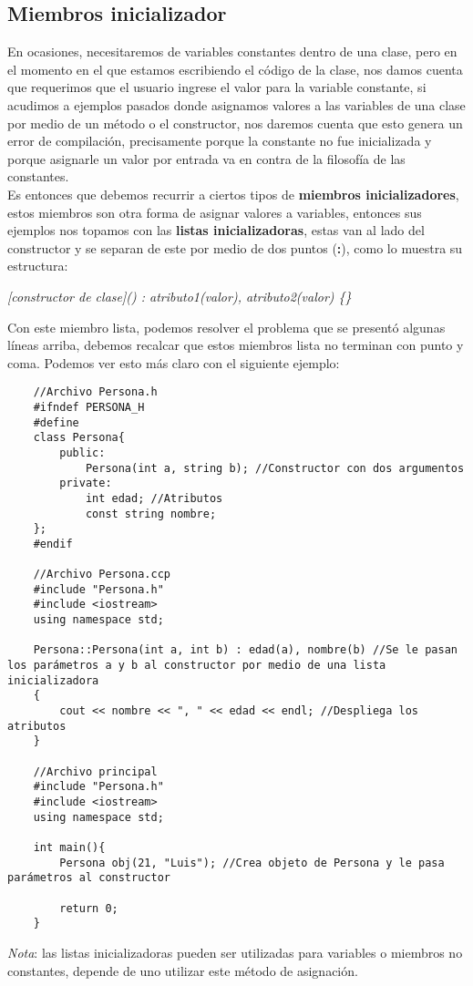 \subsection{Miembros inicializador}
En ocasiones, necesitaremos de variables constantes dentro de una clase, pero en el momento en el que estamos escribiendo el código de la clase, nos damos cuenta que requerimos que el usuario ingrese el valor para la variable constante, si acudimos a ejemplos pasados donde asignamos valores a las variables de una clase por medio de un método o el constructor, nos daremos cuenta que esto genera un error de compilación, precisamente porque la constante no fue inicializada y porque asignarle un valor por entrada va en contra de la filosofía de las constantes.\\
Es entonces que debemos recurrir a ciertos tipos de \textbf{miembros inicializadores}, estos miembros son otra forma de asignar valores a variables, entonces sus ejemplos nos topamos con las \textbf{listas inicializadoras}, estas van al lado del constructor y se separan de este por medio de dos puntos (\textbf{:}), como lo muestra su estructura:\begin{center}\textit{[constructor de clase]() : atributo1(valor), atributo2(valor) \{\}}\end{center}
Con este miembro lista, podemos resolver el problema que se presentó algunas líneas arriba, debemos recalcar que estos miembros lista no terminan con punto y coma. Podemos ver esto más claro con el siguiente ejemplo:
\begin{lstlisting}
    //Archivo Persona.h
    #ifndef PERSONA_H
    #define
    class Persona{
        public:
            Persona(int a, string b); //Constructor con dos argumentos
        private:
            int edad; //Atributos
            const string nombre;
    };
    #endif
    
    //Archivo Persona.ccp
    #include "Persona.h"
    #include <iostream>
    using namespace std;
    
    Persona::Persona(int a, int b) : edad(a), nombre(b) //Se le pasan los parámetros a y b al constructor por medio de una lista inicializadora
    {
        cout << nombre << ", " << edad << endl; //Despliega los atributos
    }
    
    //Archivo principal
    #include "Persona.h"
    #include <iostream>
    using namespace std;
    
    int main(){
        Persona obj(21, "Luis"); //Crea objeto de Persona y le pasa parámetros al constructor
    
        return 0;
    }
\end{lstlisting}
\textit{Nota}: las listas inicializadoras pueden ser utilizadas para variables o miembros no constantes, depende de uno utilizar este método de asignación.



